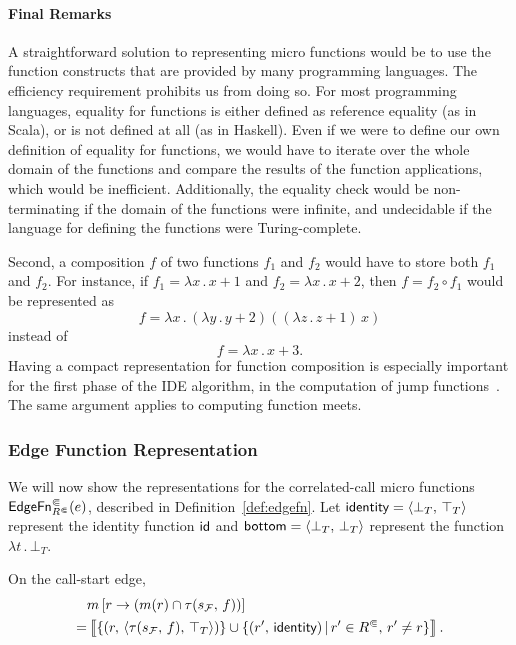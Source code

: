 \paragraph{Final Remarks}

A straightforward solution to representing micro functions would be to use the function constructs that are provided by many programming languages. The efficiency requirement prohibits us from doing so.
For most programming languages, equality for functions is either defined as reference equality (as in Scala), or is not defined at all (as in Haskell). Even if we were to define our own definition of equality for functions, we would have to iterate over the whole domain of the functions and compare the results of the function applications, which would be inefficient. Additionally, the equality check would be non-terminating if the domain of the functions were infinite, and undecidable if the language for defining the functions were Turing-complete.

Second, a composition $f$ of two functions $f_1$ and $f_2$ would have to store both $f_1$ and $f_2$. For instance, if $f_1=\lambda x\,.\,x+1$ and $f_2=\lambda x\,.\,x+2$, then $f=f_2\circ f_1$ would be represented as 
\[
  f=\lambda x\,.\,(\lambda y\,.\,y+2)((\lambda z\,.\,z+1)\,x)
\]
instead of
\[
  f=\lambda x\,.\,x+3.
\]
Having a compact representation for function composition is especially important for the first phase of the IDE algorithm, in the computation of jump functions~\cite{sagiv1996precise}. The same argument applies to computing function meets.

\subsubsection{Edge Function Representation}  \label{sec:edgefnrep}
We will now show the representations for the correlated-call micro functions $\textsf{EdgeFn}^\Subset_{{R^\Subset}}(e)$, described in Definition~\ref{def:edgefn}. Let $\textsf{identity}=\left\langle \bot_T,\,\top_T\right\rangle$ represent the identity function $\textsf{id}$ and $\textsf{bottom}=\left\langle \bot_T,\,\bot_T\right\rangle$ represent the function $\lambda t\,.\,\bot_T$.

On the call-start edge,
\begin{align}
  &m\left[r\to (m(r)\cap\tau(s_\mathcal F,\,f))\right]\notag\\
  =&\left\llbracket\{(r,\,\langle\tau(s_\mathcal F,\,f),\,\top_T\rangle)\}
    \cup
    \{(r',\,\textsf{identity})\,|\,r'\in {R^\Subset},\,r'\ne r\}\right\rrbracket.
\end{align}

